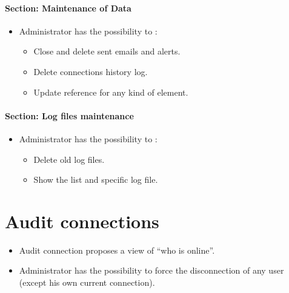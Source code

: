 \documentclass[letterpaper,10pt,english]{sphinxmanual}
\begin{document}
\paragraph{Section: Maintenance of Data}
\begin{itemize}
\item {} 
Administrator has the possibility to :
\begin{itemize}
\item {} 
Close and delete sent emails and alerts.

\item {} 
Delete connections history log.

\item {} 
Update reference for any kind of element.

\end{itemize}

\end{itemize}
\paragraph{Section: Log files maintenance}
\begin{itemize}
\item {} 
Administrator has the possibility to :
\begin{itemize}
\item {} 
Delete old log files.

\item {} 
Show the list and specific log file.

\end{itemize}

\end{itemize}


\section{Audit connections}
\label{Administration:audit-connections}\label{Administration:index-1}\begin{itemize}
\item {} 
Audit connection proposes a view of “who is online”.

\item {} 
Administrator has the possibility to force the disconnection of any user (except his own current connection).

\end{itemize}
\newpage
{}
\end{document}
